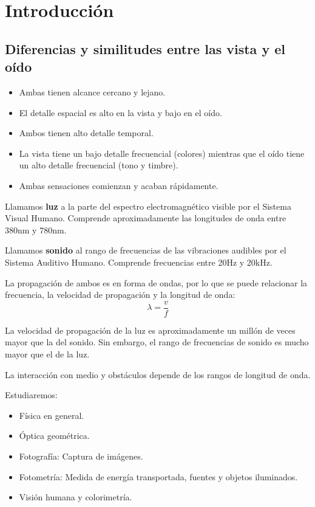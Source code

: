 \documentclass[a4paper]{book}
\begin{document}
\section{Introducción}

\subsection{Diferencias y similitudes entre las vista y el oído}
\begin{itemize}
	\item Ambas tienen alcance cercano y lejano.
	\item El detalle espacial es alto en la vista y bajo en el oído.
	\item Ambos tienen alto detalle temporal.
	\item La vista tiene un bajo detalle frecuencial (colores) mientras que el oído tiene un alto detalle frecuencial (tono y timbre).
	\item Ambas sensaciones comienzan y acaban rápidamente.
\end{itemize}

Llamamos \textbf{luz} a la parte del espectro electromagnético visible por el Sistema Visual Humano. Comprende aproximadamente las longitudes de onda entre 380nm y 780nm.

Llamamos \textbf{sonido} al rango de frecuencias de las vibraciones audibles por el Sistema Auditivo Humano. Comprende frecuencias entre 20Hz y 20kHz.

La propagación de ambos es en forma de ondas, por lo que se puede relacionar la frecuencia, la velocidad de propagación y la longitud de onda:
\[ \lambda = \frac{v}{f}  \]

La velocidad de propagación de la luz es aproximadamente un millón de veces mayor que la del sonido. Sin embargo, el rango de frecuencias de sonido es mucho mayor que el de la luz.

La interacción con medio y obstáculos depende de los rangos de longitud de onda.

Estudiaremos:
\begin{itemize}
	\item Física en general.
	\item Óptica geométrica.
	\item Fotografía: Captura de imágenes.
	\item Fotometría: Medida de energía transportada, fuentes y objetos iluminados.
	\item Visión humana y colorimetría.
\end{itemize}
\end{document}
